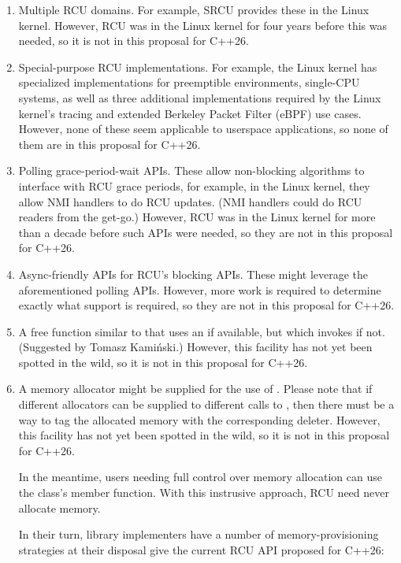 \begin{enumerate}
\item	Multiple RCU domains.
	For example, SRCU provides these in the Linux kernel.
	However, RCU was in the Linux kernel for four years before
	this was needed, so it is not in this proposal for C++26.
\item	Special-purpose RCU implementations.
	For example, the Linux kernel has specialized implementations
	for preemptible environments, single-CPU systems,
	as well as three additional implementations required by
	the Linux kernel's tracing and extended Berkeley Packet
	Filter (eBPF) use cases.
	However, none of these seem applicable to userspace applications,
	so none of them are in this proposal for C++26.
\item	Polling grace-period-wait APIs.
	These allow non-blocking algorithms to interface with RCU
	grace periods, for example, in the Linux kernel, they allow
	NMI handlers to do RCU updates.
	(NMI handlers could do RCU readers from the get-go.)
	However, RCU was in the Linux kernel for more than a decade before
	such APIs were needed, so they are not in this proposal for C++26.
\item	Async-friendly APIs for RCU's blocking APIs.
	These might leverage the aforementioned polling APIs.
	However, more work is required to determine exactly what support
	is required, so they are not in this proposal for C++26.
\item	A free function similar to  that uses
	an  if available, but which invokes
	 if not.
	(Suggested by Tomasz Kami\'{n}ski.)
	However, this facility has not yet been spotted in the wild,
	so it is not in this proposal for C++26.
\item	A memory allocator might be supplied for the use of
	.
	Please note that if different allocators can be supplied to
	different calls to , then there must be a way
	to tag the allocated memory with the corresponding deleter.
	However, this facility has not yet been spotted in the wild,
	so it is not in this proposal for C++26.

	In the meantime, users needing full control over memory allocation
	can use the  class's 
	member function.
	With this instrusive approach, RCU need never allocate memory.

	In their turn, library implementers have a number of
	 memory-provisioning strategies at their
	disposal give the current RCU API proposed for C++26:


\end{enumerate}
